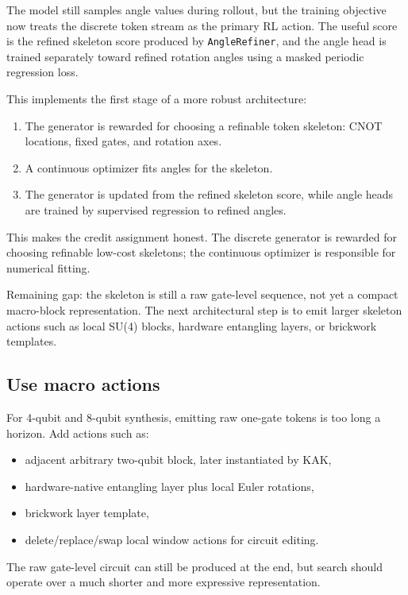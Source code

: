 \documentclass[11pt]{article}
\begin{document}
The model still samples angle values during rollout, but the training objective
now treats the discrete token stream as the primary RL action.  The useful
score is the refined skeleton score produced by \texttt{AngleRefiner}, and the
angle head is trained separately toward refined rotation angles using a masked
periodic regression loss.

This implements the first stage of a more robust architecture:
\begin{enumerate}
  \item The generator is rewarded for choosing a refinable token skeleton:
  CNOT locations, fixed gates, and rotation axes.
  \item A continuous optimizer fits angles for the skeleton.
  \item The generator is updated from the refined skeleton score, while angle
  heads are trained by supervised regression to refined angles.
\end{enumerate}

This makes the credit assignment honest.  The discrete generator is rewarded for
choosing refinable low-cost skeletons; the continuous optimizer is responsible
for numerical fitting.

Remaining gap: the skeleton is still a raw gate-level sequence, not yet a
compact macro-block representation.  The next architectural step is to emit
larger skeleton actions such as local SU(4) blocks, hardware entangling layers,
or brickwork templates.

\subsection{Use macro actions}

For 4-qubit and 8-qubit synthesis, emitting raw one-gate tokens is too long a
horizon.  Add actions such as:
\begin{itemize}
  \item adjacent arbitrary two-qubit block, later instantiated by KAK,
  \item hardware-native entangling layer plus local Euler rotations,
  \item brickwork layer template,
  \item delete/replace/swap local window actions for circuit editing.
\end{itemize}

The raw gate-level circuit can still be produced at the end, but search should
operate over a much shorter and more expressive representation.
\end{document}
